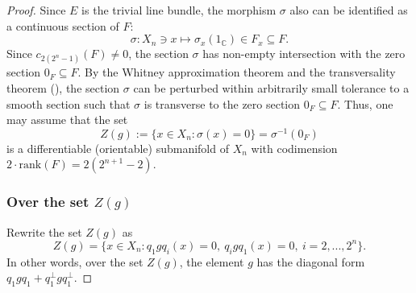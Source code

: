 \documentclass[12pt, oneside, psamsfonts]{amsart}
\theoremstyle{definition}
\theoremstyle{remark}
\numberwithin{equation}{section}
\newcommand{\Comp}{\mathbb C}
\begin{document}
\begin{proof}
Since $E$ is the trivial line bundle, the morphism $\sigma$ also can be identified as a continuous section of $F$: $$\sigma: X_{n} \ni x \mapsto \sigma_x(1_\Comp) \in F_x\subseteq F.$$ Since $ c_{2(2^n - 1)}(F) \neq 0$, the section $\sigma$ has non-empty intersection with the zero section $0_F \subseteq F$. By the Whitney approximation theorem and the transversality theorem (\cite{Hirsch-GTM}), the section $\sigma$ can be perturbed within arbitrarily small tolerance to a smooth section such that $\sigma$ is transverse to the zero section $0_F \subseteq F$. 
Thus, one may assume that the set $$Z(g) :=   \{x \in X_{n}: \sigma(x) = 0 \}=\sigma^{-1}(0_F)$$ is a differentiable (orientable) submanifold of $X_{n}$ with codimension %
 $2 \cdot \mathrm{rank}(F) = 2(2^{n+1} - 2)$.




\subsubsection*{Over the set $Z(g)$}


Rewrite the set $Z(g)$ as
\begin{equation}\label{defn-Z}
Z(g) = \{x \in X_{n}: q_1gq_i(x) = 0,\ q_igq_1(x) = 0,\ i=2, ..., 2^n\}.
\end{equation}
In other words, over the set $Z(g)$, the element $g$ has the diagonal form $q_1gq_1 + q_1^\perp g q_1^\perp$. %



\end{proof}
\end{document}
